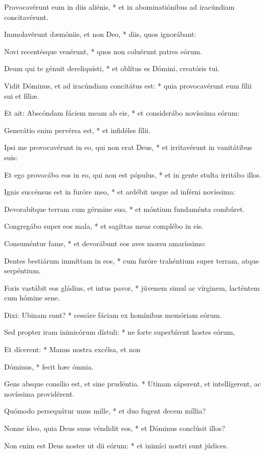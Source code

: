 Provocavérunt eum in diis aliénis, * et in abominatiónibus ad iracúndiam concitavérunt.

Immolavérunt dæmóniis, et non Deo, * diis, quos ignorábant:

Novi recentésque venérunt, * quos non coluérunt patres eórum.

Deum qui te génuit dereliquísti, * et oblítus es Dómini, creatóris tui.

Vidit Dóminus, et ad iracúndiam concitátus est: * quia provocavérunt eum fílii sui et fíliæ.

Et ait: Abscóndam fáciem meam ab eis, * et considerábo novíssima eórum:

Generátio enim pervérsa est, * et infidéles fílii.

Ipsi me provocavérunt in eo, qui non erat Deus, * et irritavérunt in vanitátibus suis:

Et ego provocábo eos in eo, qui non est pópulus, * et in gente stulta irritábo illos.

Ignis succénsus est in furóre meo, * et ardébit usque ad inférni novíssima:

Devorabítque terram cum gérmine suo, * et móntium fundaménta combúret.

Congregábo super eos mala, * et sagíttas meas complébo in eis.

Consuméntur fame, * et devorábunt eos aves morsu amaríssimo:

Dentes bestiárum immíttam in eos, * cum furóre trahéntium super terram, atque serpéntium.

Foris vastábit eos gládius, et intus pavor, * júvenem simul ac vírginem, lacténtem cum hómine sene.

Dixi: Ubinam sunt? * cessáre fáciam ex homínibus memóriam eórum.

Sed propter iram inimicórum dístuli: * ne forte superbírent hostes eórum,

Et dícerent: * Manus nostra excélsa, et non

Dóminus, * fecit hæc ómnia.

Gens absque consílio est, et sine prudéntia. * Utinam sáperent, et intellígerent, ac novíssima providérent.

Quómodo persequátur unus mille, * et duo fugent decem míllia?

Nonne ídeo, quia Deus suus véndidit eos, * et Dóminus conclúsit illos?

Non enim est Deus noster ut dii eórum: * et inimíci nostri sunt júdices.

